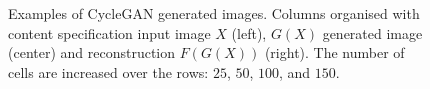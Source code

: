\begin{figure}
    \qquad
    \qquad
    \qquad
    \qquad
    \qquad
    \qquad
    \qquad
    \caption{Examples of CycleGAN generated images. Columns organised with content specification input image $X$ (left), $G(X)$ generated image (center) and reconstruction $F(G(X))$ (right). The number of cells are increased over the rows: $25$, $50$, $100$, and $150$.}%
    \label{fig:first_results_cycle_gans}%
\end{figure}

